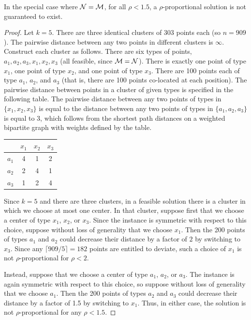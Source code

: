 \begin{claim}
	In the special case where $\mathcal {N} = \mathcal{M}$, for all $\rho < 1.5$, a $\rho$-proportional solution is not guaranteed to exist.
\end{claim}
\begin{proof}
	Let $k=5$. There are three identical clusters of 303 points each (so $n = 909$). The pairwise distance between any two points in different clusters is $\infty$. Construct each cluster as follows. There are six types of points, $a_1, a_2, a_3, x_1, x_2, x_3$ (all feasible, since $\mathcal{M} = \mathcal {N}$). There is exactly one point of type $x_1$, one point of type $x_2$, and one point of type $x_3$. There are 100 points each of type $a_1$, $a_2$, and $a_3$ (that is, there are 100 points co-located at each position). The pairwise distance between points in a cluster of given types is specified in the following table. The pairwise distance between any two points of types in $\{x_1, x_2, x_3\}$ is equal to the distance between any two points of types in $\{a_1, a_2, a_3\}$ is equal to 3, which follows from the shortest path distances on a weighted bipartite graph with weights defined by the table. 
		
\begin{center}
  \begin{tabular}{|c || c | c | c |} 
  \hline 
         & $x_1$ & $x_2$ & $x_3$ \\ \hline \hline
  $a_1$ & 4     &  1        & 2         \\ \hline
  $a_2$ & 2     &  4        & 1         \\ \hline  
  $a_3$ & 1     &  2        & 4         \\ \hline
\end{tabular}
\end{center}

Since $k = 5$ and there are three clusters, in a feasible solution there is a cluster in which we choose at most one center. In that cluster, suppose first that we choose a center of type $x_1$, $x_2$, or $x_3$. Since the instance is symmetric with respect to this choice, suppose without loss of generality that we choose $x_1$. Then the 200 points of types $a_1$ and $a_2$ could decrease their distance by a factor of $2$ by switching to $x_3$. Since any $\lceil 909/5 \rceil = 182$ points are entitled to deviate, such a choice of $x_1$ is not $\rho$-proportional for $\rho < 2$. 

Instead, suppose that we choose a center of type $a_1$, $a_2$, or $a_3$. The instance is again symmetric with respect to this choice, so suppose without loss of generality that we choose $a_1$. Then the 200 points of types $a_2$ and $a_3$ could decrease their distance by a factor of 1.5 by switching to $x_1$. Thus, in either case, the solution is not $\rho$-proportional for any $\rho < 1.5$. 
\end{proof}

